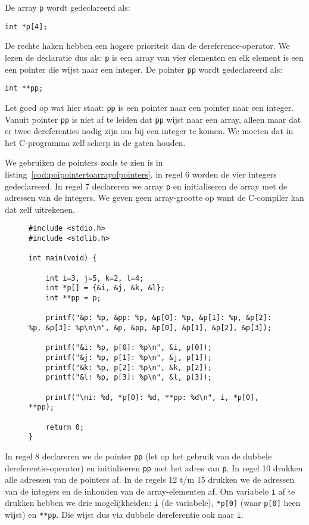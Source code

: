 De array \texttt{p} wordt gedeclareerd als:

\hspace*{1em}\lstinline|int *p[4];|

De rechte haken hebben een hogere prioriteit dan de dereference-operator. We lezen de declaratie dus als: \texttt{p} is een array van vier elementen en elk element is een een pointer die wijst naar een integer. De pointer \texttt{pp} wordt gedeclareerd als:

\hspace*{1em}\lstinline|int **pp;|

Let goed op wat hier staat: \texttt{pp} is een pointer naar een pointer naar een integer. Vanuit pointer \texttt{pp} is niet af te leiden dat \texttt{pp} wijst naar een array, alleen maar dat er twee dereferenties nodig zijn om bij een integer te komen. We moeten dat in het C-programma zelf scherp in de gaten houden.

We gebruiken de pointers zoals te zien is in listing~\ref{cod:poipointertoarrayofpointers}. in regel 6 worden de vier integers gedeclareerd. In regel 7 declareren we array \texttt{p} en initialiseren de array met de adressen van de integers. We geven geen array-grootte op want de C-compiler kan dat zelf uitrekenen.

\begin{figure}[!ht]
\begin{lstlisting}[caption=Voorbeeld van het gebruik van pointers.,label=cod:poipointertoarrayofpointers]
#include <stdio.h>
#include <stdlib.h>

int main(void) {

    int i=3, j=5, k=2, l=4;
    int *p[] = {&i, &j, &k, &l};
    int **pp = p;

    printf("&p: %p, &pp: %p, &p[0]: %p, &p[1]: %p, &p[2]: %p, &p[3]: %p\n\n", &p, &pp, &p[0], &p[1], &p[2], &p[3]);

    printf("&i: %p, p[0]: %p\n", &i, p[0]);
    printf("&j: %p, p[1]: %p\n", &j, p[1]);
    printf("&k: %p, p[2]: %p\n", &k, p[2]);
    printf("&l: %p, p[3]: %p\n", &l, p[3]);

    printf("\ni: %d, *p[0]: %d, **pp: %d\n", i, *p[0], **pp);

    return 0;
}
\end{lstlisting}
\end{figure}

In regel 8 declareren we de pointer \texttt{pp} (let op het gebruik van de dubbele dereferentie-operator) en initialiseren \texttt{pp} met het adres van \texttt{p}. In regel 10 drukken alle adressen van de pointers af. In de regels 12 t/m 15 drukken we de adressen van de integers en de inhouden van de array-elementen af. Om variabele \texttt{i} af te drukken hebben we drie mogelijkheiden: \texttt{i} (de variabele), \texttt{*p[0]} (waar \texttt{p[0]} heen wijst) en \texttt{**pp}. Die wijst dus via dubbele dereferentie ook naar \texttt{i}.

